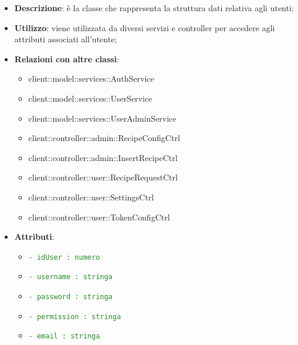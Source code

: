 			\begin{itemize}
				\item \textbf{Descrizione}: è la classe che rappresenta la struttura dati relativa agli utenti;
				\item \textbf{Utilizzo}: viene utilizzata da diversi servizi e controller per accedere agli attributi associati all'utente;
				\item \textbf{Relazioni con altre classi}:
					\begin{itemize}
						\item client::model::services::AuthService
						\item client::model::services::UserService
						\item client::model::services::UserAdminService
						\item client::controller::admin::RecipeConfigCtrl
						\item client::controller::admin::InsertRecipeCtrl
						\item client::controller::user::RecipeRequestCtrl
						\item client::controller::user::SettingsCtrl
						\item client::controller::user::TokenConfigCtrl
					\end{itemize}
				\item \textbf{Attributi}:
					\begin{itemize}
						\item \textcolor{forestgreen}{\texttt{- idUser : numero}}
						\item \textcolor{forestgreen}{\texttt{- username : stringa}}
						\item \textcolor{forestgreen}{\texttt{- password : stringa}}
						\item \textcolor{forestgreen}{\texttt{- permission : stringa}}
						\item \textcolor{forestgreen}{\texttt{- email : stringa}}
					\end{itemize}

			\end{itemize}
